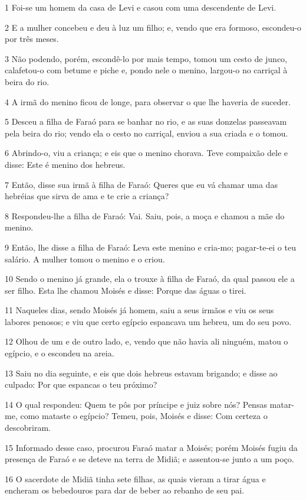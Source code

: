 \par 1 Foi-se um homem da casa de Levi e casou com uma descendente de Levi.
\par 2 E a mulher concebeu e deu à luz um filho; e, vendo que era formoso, escondeu-o por três meses.
\par 3 Não podendo, porém, escondê-lo por mais tempo, tomou um cesto de junco, calafetou-o com betume e piche e, pondo nele o menino, largou-o no carriçal à beira do rio.
\par 4 A irmã do menino ficou de longe, para observar o que lhe haveria de suceder.
\par 5 Desceu a filha de Faraó para se banhar no rio, e as suas donzelas passeavam pela beira do rio; vendo ela o cesto no carriçal, enviou a sua criada e o tomou.
\par 6 Abrindo-o, viu a criança; e eis que o menino chorava. Teve compaixão dele e disse: Este é menino dos hebreus.
\par 7 Então, disse sua irmã à filha de Faraó: Queres que eu vá chamar uma das hebréias que sirva de ama e te crie a criança?
\par 8 Respondeu-lhe a filha de Faraó: Vai. Saiu, pois, a moça e chamou a mãe do menino.
\par 9 Então, lhe disse a filha de Faraó: Leva este menino e cria-mo; pagar-te-ei o teu salário. A mulher tomou o menino e o criou.
\par 10 Sendo o menino já grande, ela o trouxe à filha de Faraó, da qual passou ele a ser filho. Esta lhe chamou Moisés e disse: Porque das águas o tirei.
\par 11 Naqueles dias, sendo Moisés já homem, saiu a seus irmãos e viu os seus labores penosos; e viu que certo egípcio espancava um hebreu, um do seu povo.
\par 12 Olhou de um e de outro lado, e, vendo que não havia ali ninguém, matou o egípcio, e o escondeu na areia.
\par 13 Saiu no dia seguinte, e eis que dois hebreus estavam brigando; e disse ao culpado: Por que espancas o teu próximo?
\par 14 O qual respondeu: Quem te pôs por príncipe e juiz sobre nós? Pensas matar-me, como mataste o egípcio? Temeu, pois, Moisés e disse: Com certeza o descobriram.
\par 15 Informado desse caso, procurou Faraó matar a Moisés; porém Moisés fugiu da presença de Faraó e se deteve na terra de Midiã; e assentou-se junto a um poço.
\par 16 O sacerdote de Midiã tinha sete filhas, as quais vieram a tirar água e encheram os bebedouros para dar de beber ao rebanho de seu pai.
